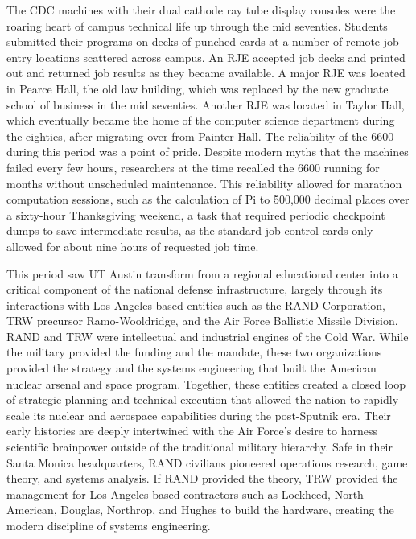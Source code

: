 The CDC machines with their dual cathode ray tube display consoles were the roaring heart of campus technical life up through the mid seventies. Students submitted their programs on decks of punched cards at a number of remote job entry locations scattered across campus. An RJE accepted job decks and printed out and returned job results as they became available. A major RJE was located in Pearce Hall, the old law building, which was replaced by the new graduate school of business in the mid seventies. Another RJE was located in Taylor Hall, which eventually became the home of the computer science department during the eighties, after migrating over from Painter Hall. The reliability of the 6600 during this period was a point of pride. Despite modern myths that the machines failed every few hours, researchers at the time recalled the 6600 running for months without unscheduled maintenance. This reliability allowed for marathon computation sessions, such as the calculation of Pi to 500,000 decimal places over a sixty-hour Thanksgiving weekend, a task that required periodic checkpoint dumps to save intermediate results, as the standard job control cards only allowed for about nine hours of requested job time.

This period saw UT Austin transform from a regional educational center into a critical component of the national defense infrastructure, largely through its interactions with Los Angeles-based entities such as the RAND Corporation, TRW precursor Ramo-Wooldridge, and the Air Force Ballistic Missile Division. RAND and TRW were intellectual and industrial engines of the Cold War. While the military provided the funding and the mandate, these two organizations provided the strategy and the systems engineering that built the American nuclear arsenal and space program. Together, these entities created a closed loop of strategic planning and technical execution that allowed the nation to rapidly scale its nuclear and aerospace capabilities during the post-Sputnik era. Their early histories are deeply intertwined with the Air Force’s desire to harness scientific brainpower outside of the traditional military hierarchy. Safe in their Santa Monica headquarters, RAND civilians pioneered operations research, game theory, and systems analysis. If RAND provided the theory, TRW provided the management for Los Angeles based contractors such as Lockheed, North American, Douglas, Northrop, and Hughes to build the hardware, creating the modern discipline of systems engineering.

